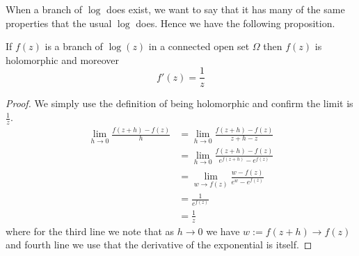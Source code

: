 When a branch of $\log$ does exist, we want to say that it has many of the same properties that the usual $\log$ does. Hence we have the following proposition.
\begin{proposition}
If $f(z)$ is a branch of $\log(z)$ in a connected open set $\Omega$ then $f(z)$ is holomorphic and moreover
$$f'(z) = \frac{1}{z}$$
\end{proposition}
\begin{proof}
    We simply use the definition of being holomorphic and confirm the limit is $\frac{1}{z}$.
    \begin{align*}
        \lim_{h \to 0}\frac{f(z + h) - f(z)}{h} &= \lim_{h \to 0} \frac{f(z + h) - f(z)}{z + h - z}\\
        &= \lim_{h \to 0} \frac{f(z + h) - f(z)}{e^{f(z + h)}-  e^{f(z)}}\\
        &= \lim_{w \to f(z)} \frac{w - f(z)}{e^w - e^{f(z)}}\\
        &= \frac{1}{e^{f(z)}}\\
        &= \frac{1}{z}
    \end{align*}
    where for the third line we note that as $h \to 0$ we have $w := f(z + h) \to f(z)$ and fourth line we use that the derivative of the exponential is itself.
\end{proof}